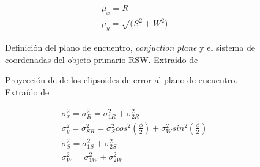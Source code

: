 {\begin{gather}
 \mu_{x}=R\\
 \mu_{y}=\sqrt(S^{2}+W^{2})
\end{gather}

\begin{figure}[!h]
\begin{minipage}[t]{0.48\textwidth}
 \centering
 \caption[Plano de encuentro y proyecci\'on del sistema RSW]{Definici\'on del plano de encuentro, {\it{conjuction plane}} y el sistema de coordenadas del objeto primario RSW. Extra\'ido de \cite{leichen}}
 \label{fig:pocplano}
\end{minipage}
\begin{minipage}[t]{0.48\textwidth}
 \centering
 \caption[Proyecci\'on de los elipsoides de error al plano de encuentro]{Proyecci\'on de de los elipsoides de error al plano de encuentro. Extra\'ido de \cite{leichen}}
\label{fig:pochorizontal}
\end{minipage}
\end{figure}

\begin{gather*}
\sigma_{x}^{2}=\sigma_{R}^{2}=\sigma_{1R}^{2}+\sigma_{2R}^{2}\\
\sigma_{y}^{2}=\sigma_{SR}^{2}=\sigma_{S}^{2}cos^{2}(\frac{\phi}{2})+\sigma_{W}^{2}sin^{2}(\frac{\phi}{2})\\
\sigma_{S}^{2}=\sigma_{1S}^{2}+\sigma_{2S}^{2}\\
\sigma_{W}^{2}=\sigma_{1W}^{2}+\sigma_{2W}^{2}\\
\end{gather*}

}
